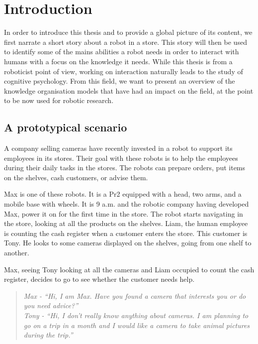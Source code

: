 
\ifdefined{}
\else
\setcounter{chapter}{0} %
\dominitoc
\faketableofcontents
\fi

\chapter{Introduction}
\minitoc

In order to introduce this thesis and to provide a global picture of its content, we first narrate a short story about a robot in a store. This story will then be used to identify some of the mains abilities a robot needs in order to interact with humans with a focus on the knowledge it needs. While this thesis is from a roboticist point of view, working on interaction naturally leads to the study of cognitive psychology. From this field, we want to present an overview of the knowledge organisation models that have had an impact on the field, at the point to be now used for robotic research.

\section{A prototypical scenario}

A company selling cameras have recently invested in a robot to support its employees in its stores. Their goal with these robots is to help the employees during their daily tasks in the stores. The robots can prepare orders, put items on the shelves, cash customers, or advise them.

Max is one of these robots. It is a Pr2 equipped with a head, two arms, and a mobile base with wheels. It is 9 a.m. and the robotic company having developed Max, power it on for the first time in the store. The robot starts navigating in the store, looking at all the products on the shelves. Liam, the human employee is counting the cash register when a customer enters the store. This customer is Tony. He looks to some cameras displayed on the shelves, going from one shelf to another.

Max, seeing Tony looking at all the cameras and Liam occupied to count the cash register, decides to go to see whether the customer needs help.

\begin{quote} 
\centering 
\textit{
Max - ``Hi, I am Max. Have you found a camera that interests you or do you need advice?'' \\
Tony - ``Hi, I don't really know anything about cameras. I am planning to go on a trip in a month and I would like a camera to take animal pictures during the trip.'' }
\end{quote}

